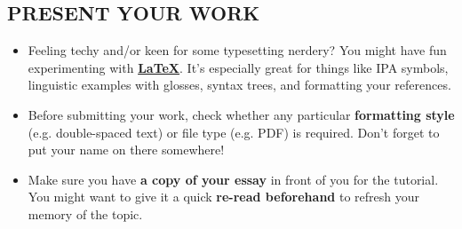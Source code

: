 \documentclass[10pt,a4paper]{article}
\begin{document}
\begin{multicols}{2}
\section*{PRESENT YOUR WORK}

\begin{itemize}

\item	Feeling techy and/or keen for some typesetting nerdery? You might have fun experimenting with
 \href{https://en.wikibooks.org/wiki/LaTeX}{\textbf{\LaTeX}}. It's especially great for things like IPA symbols, linguistic examples with glosses, syntax trees, and formatting your references.
\item	Before submitting your work, check whether any particular \textbf{formatting style} (e.g. double-spaced
text) or file type (e.g. PDF) is required. Don’t forget to put your name on there somewhere!
\item Make sure you have \textbf{a copy of your essay} in front of you for the tutorial. You might want to give it a quick
\textbf{re-read beforehand} to refresh your memory of the topic.

\end{itemize}

\end{multicols}
\end{document}
